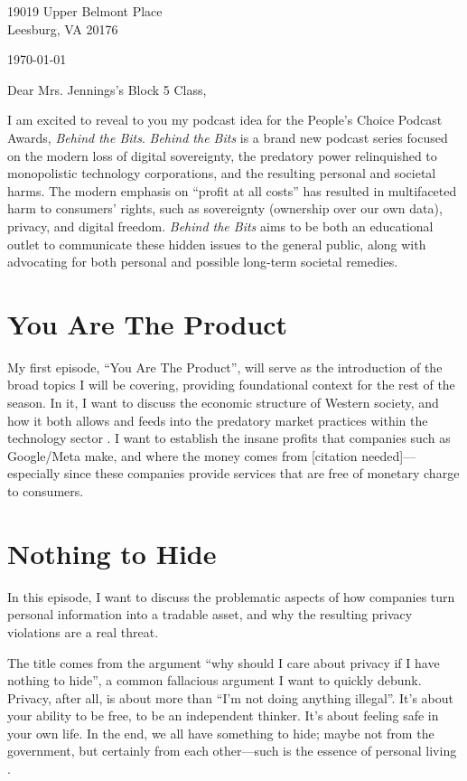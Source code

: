 \documentclass[12pt]{article}
\newcommand{\name}{\emph{Behind the Bits}}
\begin{document}
\begin{flushright}
  19019 Upper Belmont Place \\ Leesburg, VA 20176
  
  \medskip \today
\end{flushright}

\medskip
Dear Mrs. Jennings’s Block 5 Class,

\medskip I am excited to reveal to you my podcast idea for the People’s Choice
Podcast Awards, \name. \name{} is a brand new podcast series focused on the
modern loss of digital sovereignty, the predatory power relinquished to
monopolistic technology corporations, and the resulting personal and societal
harms. The modern emphasis on ``profit at all costs'' has resulted in
multifaceted harm to consumers’ rights, such as sovereignty (ownership over our
own data), privacy, and digital freedom. \name{} aims to be both an educational
outlet to communicate these hidden issues to the general public, along with
advocating for both personal and possible long-term societal remedies.

\section{You Are The Product}
My first episode, ``You Are The Product'', will serve as the introduction of the
broad topics I will be covering, providing foundational context for the rest of
the season. In it, I want to discuss the economic structure of Western society,
and how it both allows and feeds into the predatory market practices within the
technology sector \autocite{Elvy2017:PayingForPrivacyAndThePersonalDataEconomy}.
I want to establish the insane profits that companies such as Google/Meta make,
and where the money comes from [citation needed]—especially since these
companies provide services that are free of monetary charge to consumers.

\section{Nothing to Hide}
In this episode, I want to discuss the problematic aspects of how companies turn
personal information into a tradable asset, and why the resulting privacy
violations are a real threat.

The title comes from the argument ``why should I care about privacy if I have
nothing to hide'', a common fallacious argument I want to quickly debunk.
Privacy, after all, is about more than ``I'm not doing anything illegal''. It's
about your ability to be free, to be an independent thinker. It's about feeling
safe in your own life. In the end, we all have something to hide; maybe not from
the government, but certainly from each other---such is the essence of personal
living \autocite{Mordini2008:NothingHideBiometricPrivacyPrivateSphere}.
\end{document}
